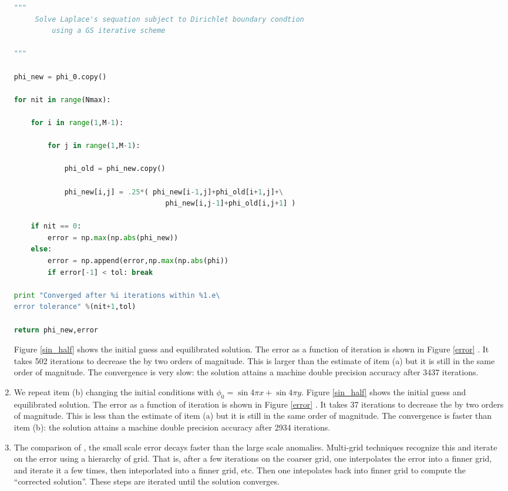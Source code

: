 \documentclass[11pt]{article}
\begin{document}
\begin{enumerate}[label=(\alph*)]
\begin{lstlisting}[language=python]
""" 
     Solve Laplace's sequation subject to Dirichlet boundary condtion 
         using a GS iterative scheme
 
"""   

phi_new = phi_0.copy() 

for nit in range(Nmax):

    for i in range(1,M-1):

        for j in range(1,M-1):
    
            phi_old = phi_new.copy()
    
            phi_new[i,j] = .25*( phi_new[i-1,j]+phi_old[i+1,j]+\
                                    phi_new[i,j-1]+phi_old[i,j+1] )

    if nit == 0:
        error = np.max(np.abs(phi_new))
    else:
        error = np.append(error,np.max(np.abs(phi))
        if error[-1] < tol: break
    
print "Converged after %i iterations within %1.e\
error tolerance" %(nit+1,tol)
         
return phi_new,error
\end{lstlisting}

Figure \ref{sin_half} shows the initial guess and equilibrated solution. The error as a function of iteration is shown in Figure \ref{error} . It takes 502 iterations to decrease the by two orders of magnitude. This is larger than the estimate of item (a) but it is still in the same order of magnitude. The convergence is very slow: the solution attains a machine double precision accuracy after 3437 iterations. 

    \item We repeat item (b) changing the initial conditions with $\phi_0 = \sin 4\pi x + \sin 4\pi y$. Figure \ref{sin_half} shows the initial guess and equilibrated solution. The error as a function of iteration is shown in Figure \ref{error} . It takes 37 iterations to decrease the by two orders of magnitude.  This is less than the estimate of item (a) but it is still in the same order of magnitude. The convergence is faster than item (b): the solution attains a machine double precision accuracy after 2934 iterations.  


    \item  The comparison of , the small scale error decays faster than the large scale anomalies. Multi-grid techniques recognize this and iterate on the error using a hierarchy of grid.  That is, after a few iterations on the coarser grid, one interpolates the error into a finner grid, and iterate it a few times, then inteporlated into a finner grid, etc. Then one intepolates back into finner grid to compute the ``corrected solution''. These steps are iterated until the solution converges.



\end{enumerate}
\end{document}
